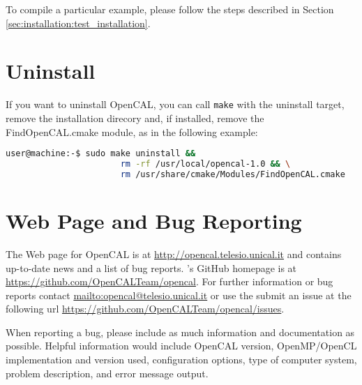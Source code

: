 To compile a particular example, please follow the steps described in
Section \ref{sec:installation:test_installation}.

\section{Uninstall}

If you want to uninstall OpenCAL, you can call \verb'make' with the
uninstall target, remove the installation direcory and, if installed,
remove the FindOpenCAL.cmake module, as in the following example:

\begin{lstlisting}[numbers=none,language=bash,label={ch:quickstart:sudouninstall}]
  user@machine:-$ sudo make uninstall && 
                       rm -rf /usr/local/opencal-1.0 && \
                       rm /usr/share/cmake/Modules/FindOpenCAL.cmake
\end{lstlisting}

\section{Web Page and Bug Reporting}

The Web page for OpenCAL is at \url{http://opencal.telesio.unical.it} and
contains up-to-date news and a list of bug reports. \ocal's GitHub
homepage is at \url{https://github.com/OpenCALTeam/opencal}. For
further information or bug reports contact
\url{mailto:opencal@telesio.unical.it} or use the submit an issue at the
following url \url{https://github.com/OpenCALTeam/opencal/issues}.

When reporting a bug, please include as much information and
documentation as possible. Helpful information would include OpenCAL
version, OpenMP/OpenCL implementation and version used,
configuration options, type of computer system, problem description,
and error message output.
